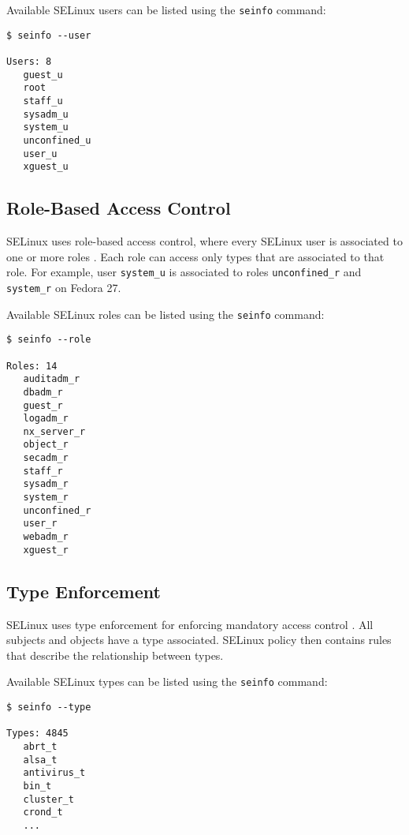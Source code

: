 Available SELinux users can be listed using the \texttt{seinfo} command:
\begin{lstlisting}
$ seinfo --user

Users: 8
   guest_u
   root
   staff_u
   sysadm_u
   system_u
   unconfined_u
   user_u
   xguest_u
\end{lstlisting}

\subsection{Role-Based Access Control}
\label{rbac}
SELinux uses role-based access control, where every SELinux user is associated
to one or more roles \cite[p.~24]{tsn}. Each role can access only types
that are associated to that role. For example, user \texttt{system\_u} is
associated to roles \texttt{unconfined\_r} and \texttt{system\_r} on Fedora 27.

Available SELinux roles can be listed using the \texttt{seinfo} command:
\begin{lstlisting}
$ seinfo --role

Roles: 14
   auditadm_r
   dbadm_r
   guest_r
   logadm_r
   nx_server_r
   object_r
   secadm_r
   staff_r
   sysadm_r
   system_r
   unconfined_r
   user_r
   webadm_r
   xguest_r
\end{lstlisting}

\subsection{Type Enforcement}
\label{te}
SELinux uses type enforcement for enforcing mandatory access control
\cite[pp.~25--26]{tsn}. All subjects and objects have a type associated. SELinux
policy then contains rules that describe the relationship between types.

Available SELinux types can be listed using the \texttt{seinfo} command:
\begin{lstlisting}
$ seinfo --type

Types: 4845
   abrt_t
   alsa_t
   antivirus_t
   bin_t
   cluster_t
   crond_t
   ...
\end{lstlisting}

